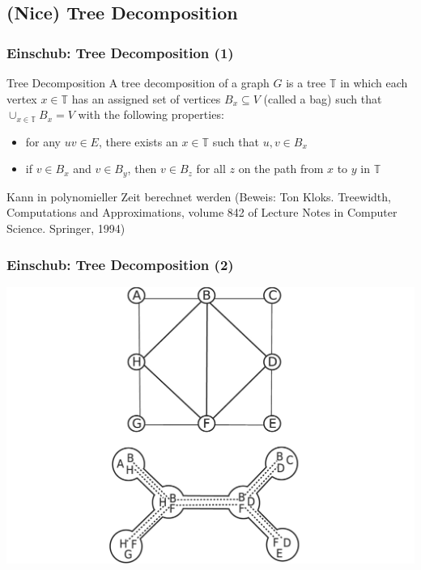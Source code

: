 \documentclass{beamer}
\begin{document}
\subsection{(Nice) Tree Decomposition}
\begin{frame}
\frametitle{Einschub: Tree Decomposition (1)}
\begin{block}{Tree Decomposition}
A tree decomposition of a graph $G$ is a tree $\mathbb{T}$ in which each vertex $x \in \mathbb{T}$ has an assigned set of vertices $B_x \subseteq V$ (called a bag) such that $\cup_{x \in \mathbb{T}} B_x = V$ with the following properties:
\begin{itemize}
\item for any $uv \in E$, there exists an $x \in \mathbb{T}$ such that $u,v \in B_x$
\item if $v \in B_x$ and $v \in B_y$, then $v \in B_z$ for all $z$ on the path from $x$ to $y$ in $\mathbb{T}$
\end{itemize}
\end{block}
Kann in polynomieller Zeit berechnet werden (Beweis: Ton Kloks. Treewidth, Computations and Approximations, volume 842 of Lecture Notes in Computer Science. Springer, 1994)
\end{frame}
\begin{frame}
\frametitle{Einschub: Tree Decomposition (2)}
\begin{center}
\includegraphics[scale=0.15]{./imgs/tree_decomposition1.png}
\end{center}
\end{frame}
\end{document}
